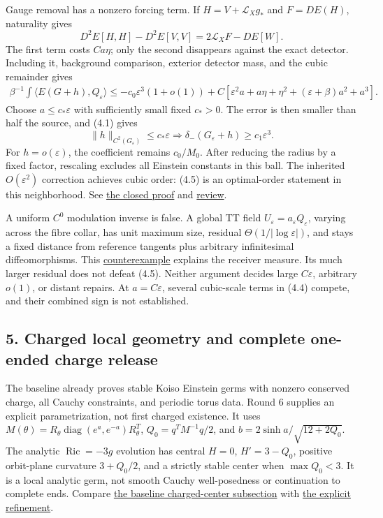\documentclass[
  english,
]{article}
\begin{document}
Gauge removal has a nonzero forcing term. If \(H=V+\mathcal L_Xg_*\) and
\(F=DE(H)\), naturality gives \[
D^2E[H,H]-D^2E[V,V]=2\mathcal L_XF-DE[W].
\] The first term costs \(Ca\eta\); only the second disappears against
the exact detector. Including it, background comparison, exterior
detector mass, and the cubic remainder gives \[
\begin{split}
\beta^{-1}\!\int\langle E(G+h),Q_\varepsilon\rangle
\le -c_0\varepsilon^3(1+o(1))
+C[\varepsilon^2a+a\eta+\eta^2+(\varepsilon+\beta)a^2+a^3].
\end{split}
\tag{4.4}
\] Choose \(a\le c_*\varepsilon\) with sufficiently small fixed
\(c_*>0\). The error is then smaller than half the source, and (4.1)
gives \[
\boxed{\ \|h\|_{C^2(G_\varepsilon)}\le c_*\varepsilon
\Longrightarrow\delta_-(G_\varepsilon+h)\ge c_1\varepsilon^3.\ }
\tag{4.5}
\] For \(h=o(\varepsilon)\), the coefficient remains \(c_0/M_0\). After
reducing the radius by a fixed factor, rescaling excludes all Einstein
constants in this ball. The inherited \(O(\varepsilon^2)\) correction
achieves cubic order: (4.5) is an optimal-order statement in this
neighborhood. See \href{../proofs/round6_construction.md}{the closed
proof} and \href{../proofs/round6_receiver_review.md}{review}.

A uniform \(C^0\) modulation inverse is false. A global TT field
\(U_\varepsilon=a_\varepsilon Q_\varepsilon\), varying across the fibre
collar, has unit maximum size, residual \(\Theta(1/|\log\varepsilon|)\),
and stays a fixed distance from reference tangents plus arbitrary
infinitesimal diffeomorphisms. This
\href{../proofs/round5_modulation.md}{counterexample} explains the
receiver measure. Its much larger residual does not defeat (4.5).
Neither argument decides large \(C\varepsilon\), arbitrary \(o(1)\), or
distant repairs. At \(a=C\varepsilon\), several cubic-scale terms in
(4.4) compete, and their combined sign is not established.

\hypertarget{charged-local-geometry-and-complete-one-ended-charge-release}{%
\subsection{5. Charged local geometry and complete one-ended charge
release}\label{charged-local-geometry-and-complete-one-ended-charge-release}}

The baseline already proves stable Koiso Einstein germs with nonzero
conserved charge, all Cauchy constraints, and periodic torus data. Round
6 supplies an explicit parametrization, not first charged existence. It
uses \(M(\theta)=R_\theta\operatorname{diag}(e^a,e^{-a})R_\theta^T\),
\(Q_0=q^TM^{-1}q/2\), and \(b=2\sinh a/\sqrt{12+2Q_0}\). The analytic
\(\operatorname{Ric}=-3g\) evolution has central \(H=0\), \(H'=3-Q_0\),
positive orbit-plane curvature \(3+Q_0/2\), and a strictly stable center
when \(\max Q_0<3\). It is a local analytic germ, not smooth Cauchy
well-posedness or continuation to complete ends. Compare
\href{../baseline/research/20260916_global.tex}{the baseline
charged-center subsection} with \href{../proofs/round6_global.md}{the
explicit refinement}.
\end{document}
